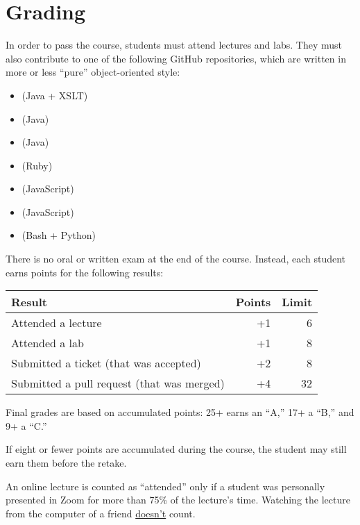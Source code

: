 \documentclass[nobrand,anonymous,nodate,nosecurity]{huawei}
\begin{document}
\newpage
\section*{Grading}

In order to pass the course, students must attend lectures and labs.
They must also contribute to one of the following GitHub repositories, which are written in more or less ``pure'' object-oriented style:

\begin{itemize}
    \item \href{https://github.com/objectionary/eo}{} (Java + XSLT)
    \item \href{https://github.com/yegor256/cactoos}{} (Java)
    \item \href{https://github.com/yegor256/takes}{} (Java)
    \item \href{https://github.com/yegor256/factbase}{} (Ruby)
    \item \href{https://github.com/objectionary/eoc}{} (JavaScript)
    \item \href{https://github.com/objectionary/eo2js}{} (JavaScript)
    \item \href{https://github.com/yegor256/cam}{} (Bash + Python)
\end{itemize}

There is no oral or written exam at the end of the course.
Instead, each student earns points for the following results:

\renewcommand{\arraystretch}{1}
\begin{tabular}{lrr}
\toprule
Result & Points & Limit \\
\midrule
Attended a lecture & +1 & 6 \\
Attended a lab & +1 & 8 \\
Submitted a ticket (that was accepted) & +2 & 8 \\
Submitted a pull request (that was merged) & +4 & 32 \\
\bottomrule
\end{tabular}

Final grades are based on accumulated points: 25+ earns an ``A,'' 17+ a ``B,'' and 9+ a ``C.''

If eight or fewer points are accumulated during the course, the student may still earn them before the retake.

An online lecture is counted as ``attended'' only if a student was personally presented in Zoom for more than 75\% of the lecture's time.
Watching the lecture from the computer of a friend \ul{doesn't} count.
\end{document}
